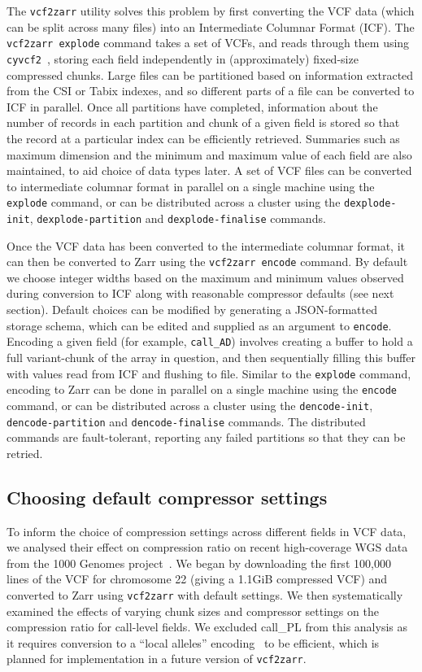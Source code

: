 \documentclass[a4paper,num-refs]{oup-contemporary}
\begin{document}
The \texttt{vcf2zarr} utility solves this problem by first converting 
the VCF data (which can be split across many files) into an Intermediate
Columnar Format (ICF). The \texttt{vcf2zarr explode} command takes a set
of VCFs, and reads through them using
\texttt{cyvcf2}~\cite{pedersen2017cyvcf2},
storing each field independently in (approximately) fixed-size 
compressed chunks.
Large files can be partitioned based on information extracted from the 
CSI or Tabix indexes, and so different parts of a file can be 
converted to ICF in parallel.
Once all partitions have completed, information about 
the number of records in each partition and chunk of a given
field is stored so that the record at a particular index 
can be efficiently retrieved. 
Summaries such as maximum dimension and the minimum and maximum value 
of each field are also maintained, to aid choice of data types later.
A set of VCF files can be converted to intermediate columnar 
format in parallel on a single machine 
using the \texttt{explode} command,
or can be distributed across a cluster using the 
\texttt{dexplode-init},
\texttt{dexplode-partition} and \texttt{dexplode-finalise} commands.

Once the VCF data has been converted to the intermediate columnar format,
it can then be converted to Zarr using the \texttt{vcf2zarr encode}
command. By default we choose integer widths based on the maximum
and minimum values observed during conversion to ICF
along with reasonable compressor defaults (see next section).
Default choices can be 
modified by generating a JSON-formatted storage schema,
which can be edited and supplied as an argument to \texttt{encode}.
Encoding a given field (for example, \texttt{call\_AD})
involves creating a buffer to hold a full variant-chunk of the 
array in question, and then sequentially filling this buffer with 
values read from ICF and flushing to file.
 Similar to the \texttt{explode} command,
encoding to Zarr can be done in parallel on a single 
machine using the \texttt{encode} command,
or can be distributed across a cluster using the 
\texttt{dencode-init},
\texttt{dencode-partition} and \texttt{dencode-finalise} commands.
The distributed commands are fault-tolerant, reporting any failed
partitions so that they can be retried.

\subsection{Choosing default compressor settings}
To inform the choice of compression settings across different fields 
in VCF data, we analysed their effect on compression ratio on 
recent high-coverage WGS data from the 1000 Genomes 
project~\citep{byrska2022high}. We began by downloading 
the first 100,000 lines of the VCF 
for chromosome 22 (giving a 1.1GiB compressed VCF)
and converted to Zarr using 
\texttt{vcf2zarr} with default settings. We then systematically 
examined the effects of varying chunk sizes and compressor settings
on the compression ratio for call-level fields. We excluded call\_PL
from this analysis as it requires conversion to a ``local alleles''
encoding~\citep{poterba2024scalable} to be efficient, 
which is planned for implementation in a future 
version of \texttt{vcf2zarr}.
\end{document}
